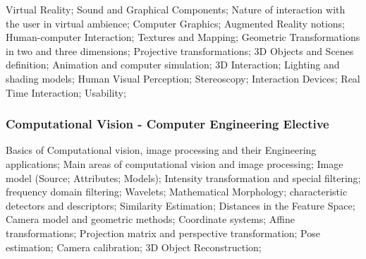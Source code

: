 Virtual Reality; Sound and Graphical Components; Nature of interaction with the user in virtual ambience; Computer Graphics; Augmented Reality notions; Human-computer Interaction; Textures and Mapping; Geometric Transformations in two and three dimensions; Projective transformations; 3D Objects and Scenes definition; Animation and computer simulation; 3D Interaction; Lighting and shading models; Human Visual Perception; Stereoscopy; Interaction Devices; Real Time Interaction; Usability;

\subsubsection{Computational Vision - Computer Engineering Elective}

Basics of Computational vision, image processing and their Engineering applications; Main areas of computational vision and image processing; Image model (Source; Attributes; Models); Intensity transformation and special filtering; frequency domain filtering; Wavelets; Mathematical Morphology; characteristic detectors and descriptors; Similarity Estimation; Distances in the Feature Space; Camera model and geometric methods; Coordinate systems; Affine transformations; Projection matrix and perspective transformation; Pose estimation; Camera calibration; 3D Object Reconstruction; 

\newpage


